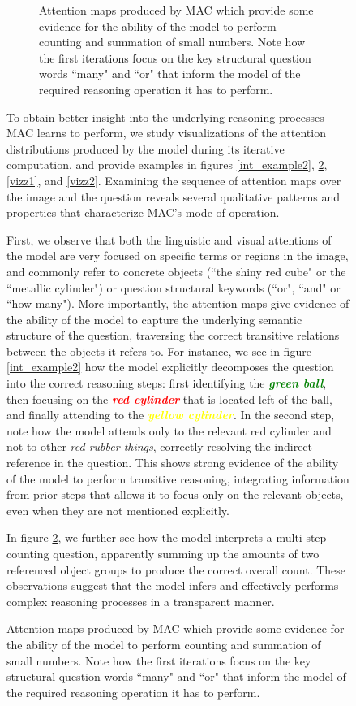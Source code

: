 \documentclass[fleqn]{article}
\begin{document}
\begin{figure}[t]
\begin{minipage}{0.55\textwidth}
\begin{figure}[t]
\vspace*{-4mm}

\scriptsize 

\caption{Attention maps produced by MAC which provide some evidence for the ability of the model to perform counting and summation of small numbers. Note how the first iterations focus on the key structural question words ``many" and ``or" that inform the model of the required reasoning operation it has to perform.}
\label{intr}

\end{figure}

To obtain better insight into the underlying reasoning processes MAC learns to perform, we study visualizations of the attention distributions produced by the model during its iterative computation, and provide examples in figures \ref{int_example2}, \ref{intr}, \ref{vizz1}, and \ref{vizz2}. Examining the sequence of attention maps over the image and the question reveals several qualitative patterns and properties that characterize MAC's mode of operation. 

First, we observe that both the linguistic and visual attentions of the model are very focused on specific terms or regions in the image, and commonly refer to concrete objects (``the shiny red cube" or the ``metallic cylinder") or question structural keywords (``or", ``and" or ``how many"). More importantly, the attention maps give evidence of the ability of the model to capture the  underlying semantic structure of the question, traversing the correct transitive relations between the objects it refers to. For instance, we see in figure \ref{int_example2} how the model explicitly decomposes the question into the correct reasoning steps: first identifying the \textcolor{green}{\textit{\textbf{green ball}}}, then focusing on the \textcolor{red}{\textit{\textbf{red cylinder}}} that is located left of the ball, and finally attending to the \textcolor{yellow}{\textit{\textbf{yellow cylinder}}}. In the second step, note how the model attends only to the relevant red cylinder and not to other \textit{red rubber things}, correctly resolving the indirect reference in the question. This shows strong evidence of the ability of the model to perform transitive reasoning, integrating information from prior steps that allows it to focus only on the relevant objects, even when they are not mentioned explicitly.


In figure \ref{intr}, we further see how the model interprets a multi-step counting question, apparently summing up the amounts of two referenced object groups to produce the correct overall count. These observations suggest that the model infers and effectively performs complex reasoning processes in a transparent manner.  

\end{minipage}
\end{figure}
\end{document}
